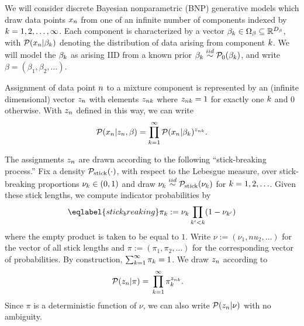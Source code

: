 We will consider discrete Bayesian nonparametric (BNP) generative models which
draw data points $x_n$ from one of an infinite number of components indexed by
$k = 1, 2, \ldots, \infty$.
Each component is characterized by a vector $\beta_k \in \Omega_{\beta} \subseteq
\mathbb{R}^{{D_{\beta}}}$, with $\mathcal{P}(x_n \vert \beta_k)$ denoting the
distribution of data arising from  component $k$. We will model the $\beta_k$
as arising IID from a known prior $\beta_k \overset{iid}{\sim} \mathcal{P}_{0}(\beta_k)$, and write
$\beta = (\beta_1, \beta_2, \ldots)$.

Assignment of data point $n$ to a mixture component is represented by an
(infinite dimensional) vector $z_n$ with elements $z_{nk}$
where $z_{nk} = 1$ for exactly one $k$ and $0$ otherwise.
With $z_n$ defined in this way, we can write
%
\begin{align*}
%
\p(\x_n \vert \z_\n, \beta) =
    \prod_{k=1}^\infty \p(\x_n \vert \beta_\k)^{\z_{\n\k}}.
%
\end{align*}


The assignments $z_{n}$ are drawn according to the following
``stick-breaking process.''  Fix a density $\mathcal{P}_{\mathrm{stick}}(\cdot)$, with respect to the
Lebesgue measure, over stick-breaking proportions $\nu_{k} \in (0, 1)$ and
draw $\nu_{k}\overset{iid}{\sim}\mathcal{P}_{\mathrm{stick}}(\nu_{k})$ for $k=1,2,\ldots$.
Given these stick lengths, we compute indicator probabilities by
%
\begin{align}\eqlabel{stick_breaking}
%
\pi_\k := \nuk \prod_{\k' < \k} (1 - \nu_{\k'})
%
\end{align}
%
where the empty product is taken to be equal to $1$.
Write $\nu := (\nu_1, nu_2, \ldots)$ for the vector of all stick lengths
and $\pi := (\pi_1, \pi_2, \ldots)$ for the corresponding vector of
probabilities. By construction, $\sum_{k=1}^{\infty} \pi_k = 1$.
 We draw $z_n$ according to
%
\begin{align*}
%
\p(\z_\n \vert \pi) ={}&
    \prod_{k=1}^{\infty} \pi_\k^{\z_{\n\k}}.
%
\end{align*}
%
Since $\pi$ is a deterministic function of $\nu$, we can also write
$\mathcal{P}(z_n \vert \nu)$ with no ambiguity.

